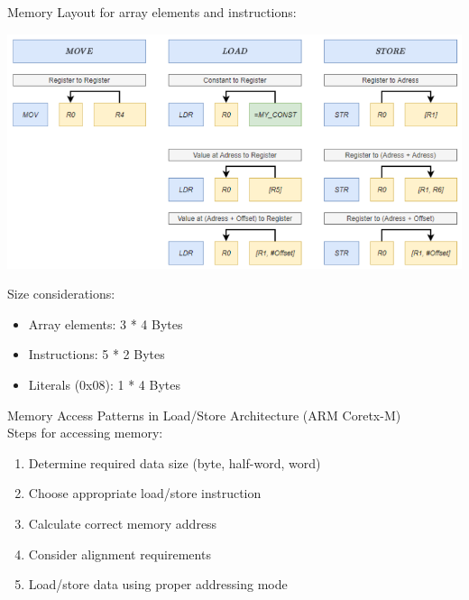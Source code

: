 \begin{corollary}{Memory Layout}
for array elements and instructions:

\includegraphics[width=\linewidth]{images/memory_layout.png}
\end{corollary}

\begin{remark}
Size considerations:
\begin{itemize}
  \item Array elements: 3 * 4 Bytes
  \item Instructions: 5 * 2 Bytes
  \item Literals (0x08): 1 * 4 Bytes
\end{itemize}
\end{remark}

\begin{KR}{Memory Access Patterns} in Load/Store Architecture (ARM Coretx-M)\\
Steps for accessing memory:
\begin{enumerate}
  \item Determine required data size (byte, half-word, word)
  \item Choose appropriate load/store instruction
  \item Calculate correct memory address
  \item Consider alignment requirements
  \item Load/store data using proper addressing mode
\end{enumerate}
\end{KR}

